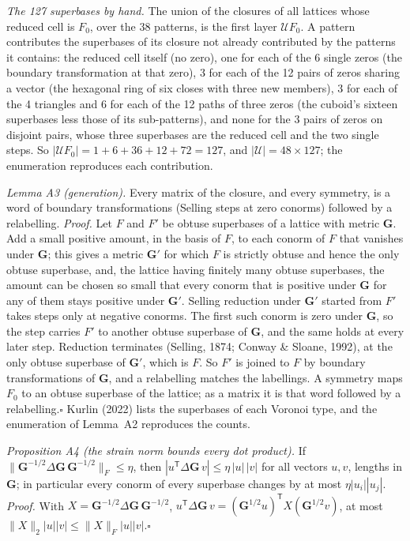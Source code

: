 \documentclass[preprint,pdf]{iucr}          %
\newcommand{\Gmet}{\mathbf{G}}
\begin{document}
\emph{The 127 superbases by hand.} The union of the closures of all lattices whose reduced cell is $F_0$, over the 38 patterns, is the first layer $\mathcal UF_0$. A pattern contributes the superbases of its closure not already contributed by the patterns it contains: the reduced cell itself (no zero), one for each of the 6 single zeros (the boundary transformation at that zero), 3 for each of the 12 pairs of zeros sharing a vector (the hexagonal ring of six closes with three new members), 3 for each of the 4 triangles and 6 for each of the 12 paths of three zeros (the cuboid's sixteen superbases less those of its sub-patterns), and none for the 3 pairs of zeros on disjoint pairs, whose three superbases are the reduced cell and the two single steps. So $|\mathcal UF_0|=1+6+36+12+72=127$, and $|\mathcal U|=48\times127$; the enumeration reproduces each contribution.

\emph{Lemma A3 (generation).} Every matrix of the closure, and every symmetry, is a word of boundary transformations (Selling steps at zero conorms) followed by a relabelling. \emph{Proof.} Let $F$ and $F'$ be obtuse superbases of a lattice with metric $\Gmet$. Add a small positive amount, in the basis of $F$, to each conorm of $F$ that vanishes under $\Gmet$; this gives a metric $\Gmet'$ for which $F$ is strictly obtuse and hence the only obtuse superbase, and, the lattice having finitely many obtuse superbases, the amount can be chosen so small that every conorm that is positive under $\Gmet$ for any of them stays positive under $\Gmet'$. Selling reduction under $\Gmet'$ started from $F'$ takes steps only at negative conorms. The first such conorm is zero under $\Gmet$, so the step carries $F'$ to another obtuse superbase of $\Gmet$, and the same holds at every later step. Reduction terminates (Selling, 1874; Conway \& Sloane, 1992), at the only obtuse superbase of $\Gmet'$, which is $F$. So $F'$ is joined to $F$ by boundary transformations of $\Gmet$, and a relabelling matches the labellings. A symmetry maps $F_0$ to an obtuse superbase of the lattice; as a matrix it is that word followed by a relabelling.\hfill$\square$ Kurlin (2022) lists the superbases of each Voronoi type, and the enumeration of Lemma~A2 reproduces the counts.

\emph{Proposition A4 (the strain norm bounds every dot product).} If $\|\Gmet^{-1/2}\Delta\Gmet\,\Gmet^{-1/2}\|_F\le\eta$, then $|u^{\mathsf T}\Delta\Gmet\,v|\le\eta\,|u|\,|v|$ for all vectors $u,v$, lengths in $\Gmet$; in particular every conorm of every superbase changes by at most $\eta|u_i||u_j|$. \emph{Proof.} With $X=\Gmet^{-1/2}\Delta\Gmet\,\Gmet^{-1/2}$, $u^{\mathsf T}\Delta\Gmet\,v=(\Gmet^{1/2}u)^{\mathsf T}X(\Gmet^{1/2}v)$, at most $\|X\|_2|u||v|\le\|X\|_F|u||v|$.\hfill$\square$
\end{document}
